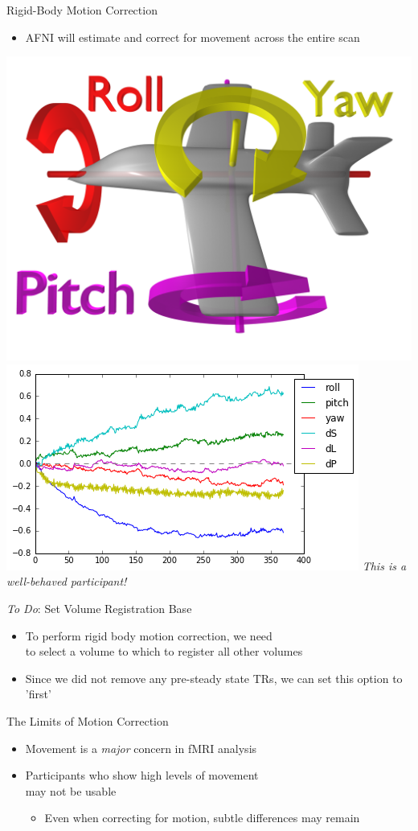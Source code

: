 \documentclass[t,12pt]{beamer}
\begin{document}
\begin{frame}{Rigid-Body Motion Correction}
\vspace{10pt}
\begin{itemize}
\setlength\itemsep{1em}
\item AFNI will estimate and correct for movement across the entire scan
\end{itemize}
\vspace{4pt}
\includegraphics[width=.5\textwidth]{images/Flight_dynamics_with_text.png}
\includegraphics[width=.5\textwidth]{images/motion_regressors.png}
\centering
\vspace{10pt}
\textit{This is a well-behaved participant!}
\end{frame}

\begin{frame}{\emph{To Do}: Set Volume Registration Base}
\vspace{10pt}
\begin{itemize}
\setlength\itemsep{1em}
\item To perform rigid body motion correction, we need \\ to select a volume to which to register all other volumes
\item Since we did not remove any pre-steady state TRs, we can set this option to 'first'
\end{itemize}
\end{frame}

\begin{frame}{The Limits of Motion Correction}
\vspace{10pt}
\begin{itemize}
\setlength\itemsep{1em}
\item Movement is a \emph{major} concern in fMRI analysis
\item Participants who show high levels of movement \\ may not be usable
\vspace{4pt}
\begin{itemize}
\item Even when correcting for motion, subtle differences may remain
\end{itemize}
\end{itemize}
\end{frame}
\end{document}
